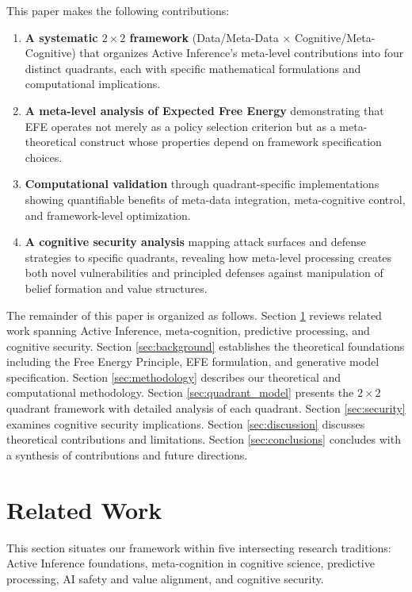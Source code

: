 \documentclass[
]{article}
\begin{document}
This paper makes the following contributions:

\begin{enumerate}
\def\labelenumi{\arabic{enumi}.}
\item
  \textbf{A systematic \(2 \times 2\) framework} (Data/Meta-Data
  \(\times\) Cognitive/Meta-Cognitive) that organizes Active Inference's
  meta-level contributions into four distinct quadrants, each with
  specific mathematical formulations and computational implications.
\item
  \textbf{A meta-level analysis of Expected Free Energy} demonstrating
  that EFE operates not merely as a policy selection criterion but as a
  meta-theoretical construct whose properties depend on framework
  specification choices.
\item
  \textbf{Computational validation} through quadrant-specific
  implementations showing quantifiable benefits of meta-data
  integration, meta-cognitive control, and framework-level optimization.
\item
  \textbf{A cognitive security analysis} mapping attack surfaces and
  defense strategies to specific quadrants, revealing how meta-level
  processing creates both novel vulnerabilities and principled defenses
  against manipulation of belief formation and value structures.
\end{enumerate}

The remainder of this paper is organized as follows. Section
\ref{sec:related_work} reviews related work spanning Active Inference,
meta-cognition, predictive processing, and cognitive security. Section
\ref{sec:background} establishes the theoretical foundations including
the Free Energy Principle, EFE formulation, and generative model
specification. Section \ref{sec:methodology} describes our theoretical
and computational methodology. Section \ref{sec:quadrant_model} presents
the \(2 \times 2\) quadrant framework with detailed analysis of each
quadrant. Section \ref{sec:security} examines cognitive security
implications. Section \ref{sec:discussion} discusses theoretical
contributions and limitations. Section \ref{sec:conclusions} concludes
with a synthesis of contributions and future directions.

\newpage

\section{Related Work}\label{sec:related_work}

This section situates our framework within five intersecting research
traditions: Active Inference foundations, meta-cognition in cognitive
science, predictive processing, AI safety and value alignment, and
cognitive security.
\end{document}
